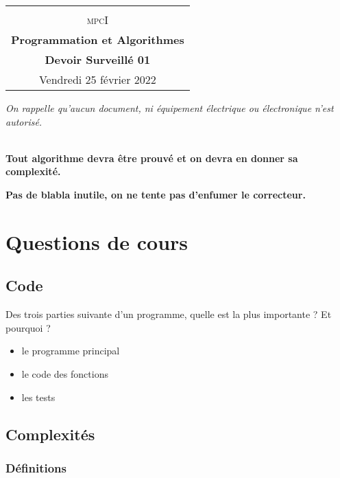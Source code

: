 \documentclass
[12pt]
{article}
\begin{document}
\begin{center}
  \begin{tabular}{c}
  \hline\\%
  {\textsc{mpc\Large{I}}}\vspace{0.1cm}
  \\
%  
    {\bf \Large \sc Programmation et Algorithmes} \\ 
    \vspace*{.2cm}
    {\bf Devoir Surveillé 01} \\
    {\footnotesize Vendredi 25 février 2022}\\
    \hline
  \end{tabular}
\end{center}
\vspace{0.6cm}
%
%
\begin{center}
{\em On rappelle qu'aucun document, ni équipement électrique ou électronique n'est autorisé. }

~\\
{\bf Tout algorithme devra être prouvé et on devra en donner sa complexité.}



{\bf Pas de blabla inutile, on ne tente pas d'enfumer le correcteur.}

\end{center}
\section{Questions de cours}

\subsection{Code}

Des trois parties suivante d'un programme, quelle est la plus importante ? Et pourquoi ?

\begin{itemize}
    \item le programme principal
    \item le code des fonctions
    \item les tests 
\end{itemize}

\subsection{Complexités}

\subsubsection{Définitions}
\end{document}
